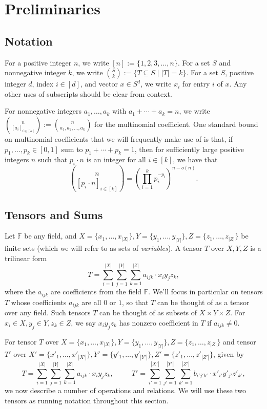 \documentclass{theoretics}
\newcommand{\F}{\mathbb{F}}
\begin{document}
\section{Preliminaries} \label{sec:prelims}

\subsection{Notation}

For a positive integer $n$, we write $[n] := \{1,2,3,\ldots,n\}$. For a set $S$ and nonnegative integer $k$, we write $\binom{S}{k} := \{ T \subseteq S \mid |T|=k\}$. For a set $S$, positive integer $d$, index $i \in [d]$, and vector $x \in S^d$, we write $x_i$ for entry $i$ of $x$. Any other uses of subscripts should be clear from context.

For nonnegative integers $a_1, \ldots, a_k$ with $a_1 + \cdots + a_k = n$, we write $\binom{n}{[a_i]_{i \in [k]}} := \binom{n}{a_1,a_2,\ldots,a_k}$ for the multinomial coefficient. One standard bound on multinomial coefficients that we will frequently make use of is that, if $p_1, \ldots, p_k \in [0,1]$ sum to $p_1 + \cdots + p_k = 1$, then for sufficiently large positive integers $n$ such that $p_i \cdot n$ is an integer for all $i \in [k]$, we have that $$\binom{n}{[p_i \cdot n]_{i \in [k]}} = \left( \prod_{i=1}^k p_i^{-p_i} \right)^{n - o(n)}.$$


\subsection{Tensors and Sums}

Let $\F$ be any field, and $X = \{x_1, \ldots, x_{|X|}\},Y=\{y_1,\ldots,y_{|Y|}\},Z=\{z_1, \ldots, z_{|Z|}\}$ be finite sets (which we will refer to as sets of \emph{variables}). A tensor $T$ over $X,Y,Z$ is a trilinear form $$T = \sum_{i=1}^{|X|} \sum_{j=1}^{|Y|} \sum_{k=1}^{|Z|} a_{ijk} \cdot x_i  y_j  z_k,$$ where the $a_{ijk}$ are coefficients from the field $\F$. We'll focus in particular on tensors $T$ whose coefficients $a_{ijk}$ are all $0$ or $1$, so that $T$ can be thought of as a tensor over any field. Such tensors $T$ can be thought of as subsets of $X \times Y \times Z$. For $x_i \in X, y_j \in Y, z_k \in Z$, we say $x_i  y_j  z_k$ has nonzero coefficient in $T$ if $a_{ijk} \neq 0$.

For tensor $T$ over $X = \{x_1, \ldots, x_{|X|}\},Y=\{y_1,\ldots,y_{|Y|}\},Z=\{z_1, \ldots, z_{|Z|}\}$ and tensor $T'$ over $X' = \{x'_1, \ldots, x'_{|X'|}\},Y'=\{y'_1,\ldots,y'_{|Y'|}\},Z'=\{z'_1, \ldots, z'_{|Z'|}\}$,  given by $$T = \sum_{i=1}^{|X|} \sum_{j=1}^{|Y|} \sum_{k=1}^{|Z|} a_{ijk} \cdot x_i  y_j  z_k, \hspace{30pt} T' = \sum_{i'=1}^{|X'|} \sum_{j'=1}^{|Y'|} \sum_{k'=1}^{|Z'|} b_{i'j'k'} \cdot x'_{i'}  y'_{j'}  z'_{k'},$$ we now describe a number of operations and relations. We will use these two tensors as running notation throughout this section.
\end{document}
